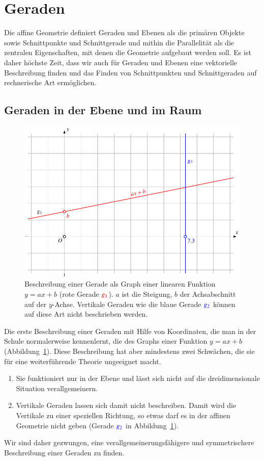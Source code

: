 %
%
%
\section{Geraden%
\label{skript:section:geraden}}
Die affine Geometrie definiert Geraden und Ebenen als die primären Objekte
sowie Schnittpunkte und Schnittgerade und mithin die Parallelität als die
zentralen Eigenschaften, mit denen die Geometrie aufgebaut werden soll.
Es ist daher höchste Zeit, dass wir auch für Geraden und Ebenen eine
vektorielle Beschreibung finden und das Finden von Schnittpunkten
und Schnittgeraden auf rechnerische Art ermöglichen.

%
%
\subsection{Geraden in der Ebene und im Raum}
\begin{figure}
\centering
\includegraphics{3/images/geradeaxb.pdf}
\caption{Beschreibung einer Gerade als Graph einer linearen Funktion
$y=ax+b$ (rote Gerade $\color{red}g_1$).
$a$ ist die Steigung, $b$ der Achsabschnitt auf der $y$-Achse.
Vertikale Geraden wie die blaue Gerade $\color{blue}g_2$ können auf diese
Art nicht beschrieben werden.
\label{skript:affin:geradeaxb}}
\end{figure}
Die erste Beschreibung einer Geraden mit Hilfe von Koordinaten, die man in
der Schule normalerweise kennenlernt, die des Graphs einer Funktion
$y=ax+b$ (Abbildung~\ref{skript:affin:geradeaxb}).
Diese Beschreibung hat aber mindestens zwei Schwächen, die sie für eine
weiterführende Theorie ungeeignet macht.
\begin{enumerate}
\item Sie funktioniert nur in der Ebene und lässt sich nicht auf die
dreidimensionale Situation verallgemeinern.
\item Vertikale Geraden lassen sich damit nicht beschreiben.
Damit wird die Vertikale zu einer speziellen Richtung, so etwas darf
es in der affinen Geometrie nicht geben (Gerade $\color{blue}g_2$ in
Abbildung~\ref{skript:affin:geradeaxb}).
\end{enumerate}
Wir sind daher gezwungen, eine verallgemeinerungsfähigere und symmetrischere
Beschreibung einer Geraden zu finden.

